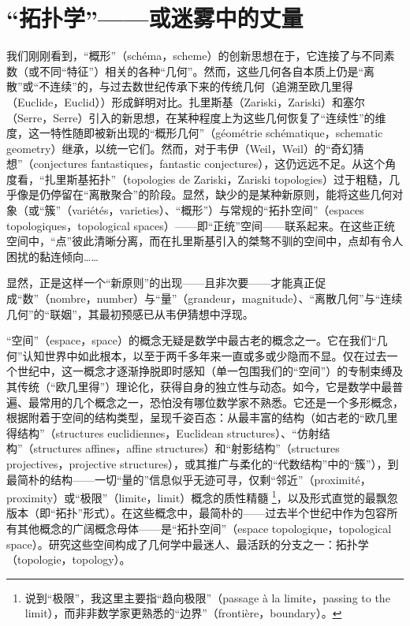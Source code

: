 \section{“拓扑学”——或迷雾中的丈量}

我们刚刚看到，“概形”（schéma，scheme）的创新思想在于，它连接了与不同素数（或不同“特征”）相关的各种“几何”。然而，这些几何各自本质上仍是“离散”或“不连续”的，与过去数世纪传承下来的传统几何（追溯至欧几里得（Euclide，Euclid））形成鲜明对比。扎里斯基（Zariski，Zariski）和塞尔（Serre，Serre）引入的新思想，在某种程度上为这些几何恢复了“连续性”的维度，这一特性随即被新出现的“概形几何”（géométrie schématique，schematic geometry）继承，以统一它们。然而，对于韦伊（Weil，Weil）的“奇幻猜想”（conjectures fantastiques，fantastic conjectures），这仍远远不足。从这个角度看，“扎里斯基拓扑”（topologies de Zariski，Zariski topologies）过于粗糙，几乎像是仍停留在“离散聚合”的阶段。显然，缺少的是某种新原则，能将这些几何对象（或“簇”（variétés，varieties）、“概形”）与常规的“拓扑空间”（espaces topologiques，topological spaces）——即“正统”空间——联系起来。在这些正统空间中，“点”彼此清晰分离，而在扎里斯基引入的桀骜不驯的空间中，点却有令人困扰的黏连倾向……

显然，正是这样一个“新原则”的出现——且非次要——才能真正促成“数”（nombre，number）与“量”（grandeur，magnitude）、“离散几何”与“连续几何”的“联姻”，其最初预感已从韦伊猜想中浮现。

“空间”（espace，space）的概念无疑是数学中最古老的概念之一。它在我们“几何”认知世界中如此根本，以至于两千多年来一直或多或少隐而不显。仅在过去一个世纪中，这一概念才逐渐挣脱即时感知（单一包围我们的“空间”）的专制束缚及其传统（“欧几里得”）理论化，获得自身的独立性与动态。如今，它是数学中最普遍、最常用的几个概念之一，恐怕没有哪位数学家不熟悉。它还是一个多形概念，根据附着于空间的结构类型，呈现千姿百态：从最丰富的结构（如古老的“欧几里得结构”（structures euclidiennes，Euclidean structures）、“仿射结构”（structures affines，affine structures）和“射影结构”（structures projectives，projective structures），或其推广与柔化的“代数结构”中的“簇”），到最简朴的结构——一切“量的”信息似乎无迹可寻，仅剩“邻近”（proximité，proximity）或“极限”（limite，limit）概念的质性精髓 \footnote{说到“极限”，我这里主要指“趋向极限”（passage à la limite，passing to the limit），而非非数学家更熟悉的“边界”（frontière，boundary）。}，以及形式直觉的最飘忽版本（即“拓扑”形式）。在这些概念中，最简朴的——过去半个世纪中作为包容所有其他概念的广阔概念母体——是“拓扑空间”（espace topologique，topological space）。研究这些空间构成了几何学中最迷人、最活跃的分支之一：拓扑学（topologie，topology）。

